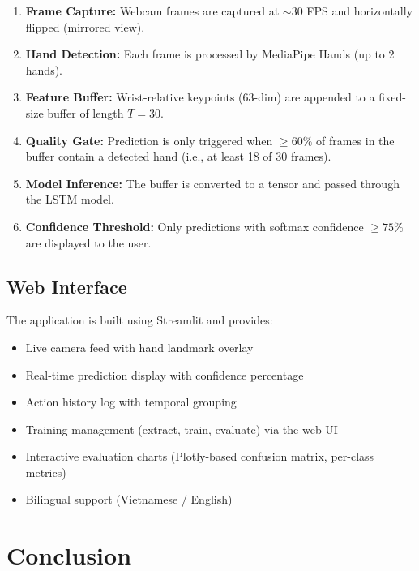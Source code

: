 \documentclass[12pt, a4paper]{article}
\begin{document}
\begin{enumerate}
    \item \textbf{Frame Capture:} Webcam frames are captured at $\sim$30 FPS and horizontally flipped (mirrored view).
    \item \textbf{Hand Detection:} Each frame is processed by MediaPipe Hands (up to 2 hands).
    \item \textbf{Feature Buffer:} Wrist-relative keypoints (63-dim) are appended to a fixed-size buffer of length $T = 30$.
    \item \textbf{Quality Gate:} Prediction is only triggered when $\geq 60\%$ of frames in the buffer contain a detected hand (i.e., at least 18 of 30 frames).
    \item \textbf{Model Inference:} The buffer is converted to a tensor and passed through the LSTM model.
    \item \textbf{Confidence Threshold:} Only predictions with softmax confidence $\geq 75\%$ are displayed to the user.
\end{enumerate}

\subsection{Web Interface}

The application is built using Streamlit and provides:
\begin{itemize}
    \item Live camera feed with hand landmark overlay
    \item Real-time prediction display with confidence percentage
    \item Action history log with temporal grouping
    \item Training management (extract, train, evaluate) via the web UI
    \item Interactive evaluation charts (Plotly-based confusion matrix, per-class metrics)
    \item Bilingual support (Vietnamese / English)
\end{itemize}

\section{Conclusion}
\label{sec:conclusion}
\end{document}
